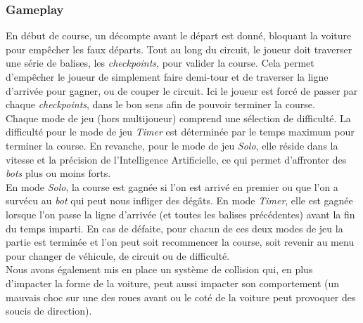 \documentclass[a4paper,12pt]{article}
\newcommand{\AI}{Intelligence Artificielle}
\begin{document}
            \subsubsection{Gameplay}
                En début de course, un décompte avant le départ est donné, bloquant la voiture pour
                empêcher les faux départs. Tout au long du circuit, le joueur doit traverser une série de 
                balises, les \textit{checkpoints}, pour valider la course. Cela permet d'empêcher le 
                joueur de simplement faire demi-tour et de traverser la ligne d'arrivée pour gagner, ou
                de couper le circuit. Ici le joueur est forcé de passer par chaque \textit{checkpoints},
                dans le bon sens afin de pouvoir terminer la course.\\
                Chaque mode de jeu (hors multijoueur) comprend une sélection de difficulté.
                La difficulté pour le mode de jeu \textsl{Timer} est déterminée par le temps maximum pour 
                terminer la course. En revanche, pour le mode de jeu \textsl{Solo}, 
                elle réside dans la vitesse et la précision de l'\AI, ce qui permet d'affronter des 
                \textit{bots} plus ou moins forts. \\
                En mode \textsl{Solo}, la course est gagnée si l'on est arrivé en premier ou que l'on a 
                survécu au \textit{bot} qui peut nous infliger des dégâts. En mode \textsl{Timer}, elle 
                est gagnée lorsque l'on passe la ligne d'arrivée (et toutes les balises précédentes) avant
                la fin du temps imparti. En cas de défaite, pour chacun de ces deux modes de jeu la partie
                est terminée et l'on peut soit recommencer la course, soit revenir au menu pour changer de
                véhicule, de circuit ou de difficulté.\\
                Nous avons également mis en place un système de collision qui, en plus d'impacter la forme de 
                la voiture, peut aussi impacter son comportement (un mauvais choc sur une des roues avant ou 
                le coté de la voiture peut provoquer des soucis de direction).
\end{document}
